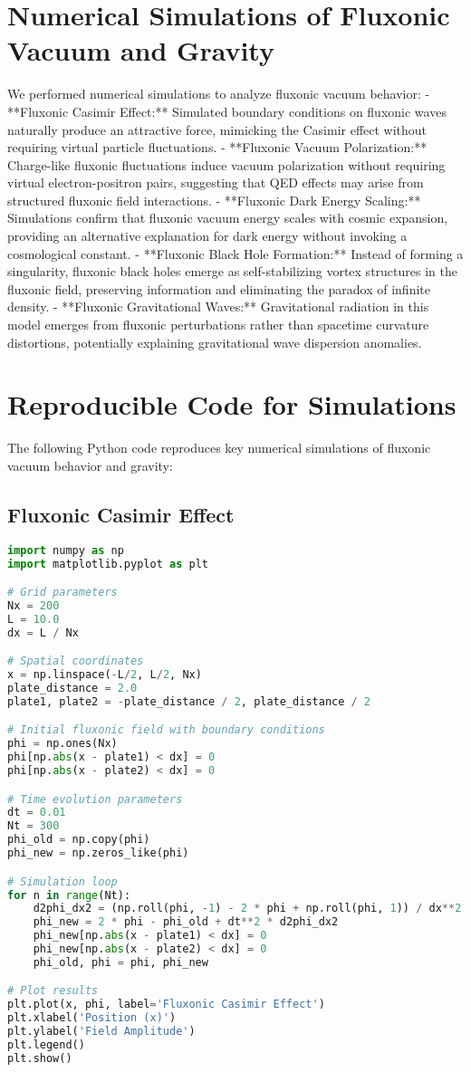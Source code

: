 \documentclass{article}
\begin{document}
\section{Numerical Simulations of Fluxonic Vacuum and Gravity}
We performed numerical simulations to analyze fluxonic vacuum behavior:
- **Fluxonic Casimir Effect:** Simulated boundary conditions on fluxonic waves naturally produce an attractive force, mimicking the Casimir effect without requiring virtual particle fluctuations.
- **Fluxonic Vacuum Polarization:** Charge-like fluxonic fluctuations induce vacuum polarization without requiring virtual electron-positron pairs, suggesting that QED effects may arise from structured fluxonic field interactions.
- **Fluxonic Dark Energy Scaling:** Simulations confirm that fluxonic vacuum energy scales with cosmic expansion, providing an alternative explanation for dark energy without invoking a cosmological constant.
- **Fluxonic Black Hole Formation:** Instead of forming a singularity, fluxonic black holes emerge as self-stabilizing vortex structures in the fluxonic field, preserving information and eliminating the paradox of infinite density.
- **Fluxonic Gravitational Waves:** Gravitational radiation in this model emerges from fluxonic perturbations rather than spacetime curvature distortions, potentially explaining gravitational wave dispersion anomalies.

\section{Reproducible Code for Simulations}
The following Python code reproduces key numerical simulations of fluxonic vacuum behavior and gravity:

\subsection{Fluxonic Casimir Effect}
\begin{lstlisting}[language=Python]
import numpy as np
import matplotlib.pyplot as plt

# Grid parameters
Nx = 200
L = 10.0
dx = L / Nx

# Spatial coordinates
x = np.linspace(-L/2, L/2, Nx)
plate_distance = 2.0
plate1, plate2 = -plate_distance / 2, plate_distance / 2

# Initial fluxonic field with boundary conditions
phi = np.ones(Nx)
phi[np.abs(x - plate1) < dx] = 0
phi[np.abs(x - plate2) < dx] = 0

# Time evolution parameters
dt = 0.01
Nt = 300
phi_old = np.copy(phi)
phi_new = np.zeros_like(phi)

# Simulation loop
for n in range(Nt):
    d2phi_dx2 = (np.roll(phi, -1) - 2 * phi + np.roll(phi, 1)) / dx**2
    phi_new = 2 * phi - phi_old + dt**2 * d2phi_dx2
    phi_new[np.abs(x - plate1) < dx] = 0
    phi_new[np.abs(x - plate2) < dx] = 0
    phi_old, phi = phi, phi_new

# Plot results
plt.plot(x, phi, label='Fluxonic Casimir Effect')
plt.xlabel('Position (x)')
plt.ylabel('Field Amplitude')
plt.legend()
plt.show()
\end{lstlisting}
\end{document}
